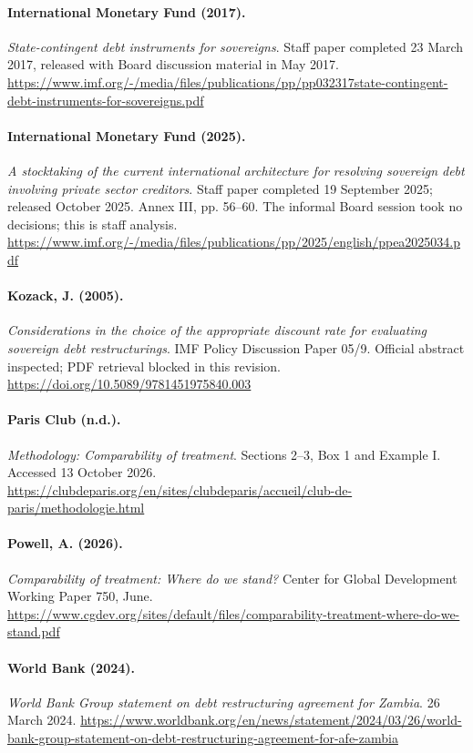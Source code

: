 \documentclass[11pt,a4paper]{article}
\begin{document}
\paragraph{International Monetary Fund (2017).}
\emph{State-contingent debt instruments for sovereigns}. Staff paper completed 23 March 2017, released with Board discussion material in May 2017. \url{https://www.imf.org/-/media/files/publications/pp/pp032317state-contingent-debt-instruments-for-sovereigns.pdf}
\paragraph{International Monetary Fund (2025).}
\emph{A stocktaking of the current international architecture for resolving sovereign debt involving private sector creditors}. Staff paper completed 19 September 2025; released October 2025. Annex III, pp. 56--60. The informal Board session took no decisions; this is staff analysis. \url{https://www.imf.org/-/media/files/publications/pp/2025/english/ppea2025034.pdf}
\paragraph{Kozack, J. (2005).}
\emph{Considerations in the choice of the appropriate discount rate for evaluating sovereign debt restructurings}. IMF Policy Discussion Paper 05/9. Official abstract inspected; PDF retrieval blocked in this revision. \url{https://doi.org/10.5089/9781451975840.003}
\paragraph{Paris Club (n.d.).}
\emph{Methodology: Comparability of treatment}. Sections 2--3, Box 1 and Example I. Accessed 13 October 2026. \url{https://clubdeparis.org/en/sites/clubdeparis/accueil/club-de-paris/methodologie.html}
\paragraph{Powell, A. (2026).}
\emph{Comparability of treatment: Where do we stand?} Center for Global Development Working Paper 750, June. \url{https://www.cgdev.org/sites/default/files/comparability-treatment-where-do-we-stand.pdf}
\paragraph{World Bank (2024).}
\emph{World Bank Group statement on debt restructuring agreement for Zambia}. 26 March 2024. \url{https://www.worldbank.org/en/news/statement/2024/03/26/world-bank-group-statement-on-debt-restructuring-agreement-for-afe-zambia}
\normalsize
\end{document}

